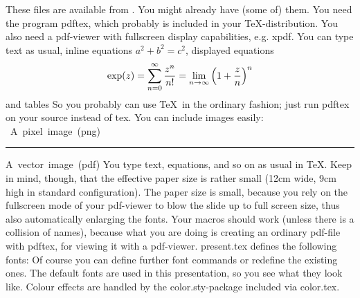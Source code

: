 \leftskip=0pt
\vskip3mm
These files are available from . You might already have (some of) them.
\vskip3mm
You need the program {\cf pdftex}, which probably is included in your \TeX-distribution.
\vskip3mm
You also need a pdf-viewer with fullscreen display capabilities, e.g. {\cf xpdf}.
\vskip5pt
\NewSlide
{}
You can type text as usual, inline equations $a^2+b^2=c^2$, displayed equations
$$
\exp(z)=\sum_{n=0}^\infty {z^n\over n!}=\lim_{n\to\infty}\Big(1+{z\over n}\Big)^n
$$
and tables
\baselineskip
{}\vbox{\offinterlineskip
{}}\vskip5pt
So you probably can use \TeX\ in the ordinary fashion; just run {\cf pdftex} on your source instead of {\cf tex}.
\NewSlide
You can include images easily:
\hbox{ A pixel image (png)}
\vskip10pt\hrule
\hbox{A vector image (pdf)}
\NewSlide
You type text, equations, and so on as usual in \TeX. Keep in mind, though, that the effective paper size is 
rather small (12cm wide, 9cm high in standard configuration).
The paper size is small, because you rely on the fullscreen mode of your pdf-viewer to blow the slide up to full 
screen size, thus also automatically enlarging the fonts.
Your macros should work (unless there is a collision of names), because what you are doing is creating an ordinary
pdf-file with {\cf pdftex}, for viewing it with a pdf-viewer.
\NewSlide
{\cf present.tex} defines the following fonts:\vskip5pt
{
}
\vskip10pt
Of course you can define further font commands or redefine the existing ones.
The default fonts are used in this presentation, so you see what they look like.
\NewSlide
Colour effects are handled by the {\cf color.sty}-package included via {\cf color.tex}.


